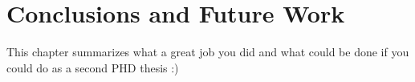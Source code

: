 \chapter{Conclusions and Future Work}

This chapter summarizes what a great job you did and what could be done if you could do as a second PHD thesis :)